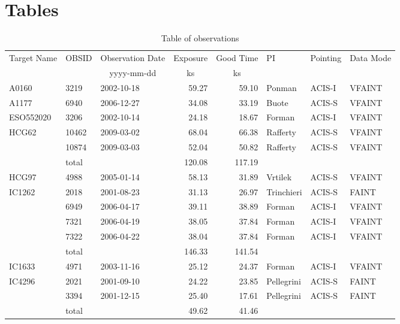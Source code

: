 \documentclass[structabstract]{aa}
\begin{document}
\section{Tables}\label{app:tables}
\begin{table}[!h]
\caption{Table of observations}
\begin{center}
\setlength\extrarowheight{2pt}
\begin{tabularx}{\textwidth}{XlXrrXXX}
\hline\hline
Target Name & \multicolumn{1}{c}{OBSID} & \multicolumn{1}{c}{Observation Date} & \multicolumn{1}{c}{Exposure} & \multicolumn{1}{c}{Good Time} & \multicolumn{1}{l}{PI} & \multicolumn{1}{l}{Pointing} & \multicolumn{1}{l}{Data Mode} \\ 
 & & \multicolumn{1}{c}{yyyy-mm-dd} & \multicolumn{1}{c}{ks} & \multicolumn{1}{c}{ks} & & & \\ \hline
A0160 & 3219 & 2002-10-18 & 59.27 & 59.10 & Ponman & ACIS-I & VFAINT \\ \hline
A1177 & 6940 & 2006-12-27 & 34.08 & 33.19 & Buote & ACIS-S & VFAINT \\ \hline
ESO552020 & 3206 & 2002-10-14 & 24.18 & 18.67 & Forman & ACIS-I & VFAINT \\ \hline
HCG62 & 10462 & 2009-03-02 & 68.04 & 66.38 & Rafferty & ACIS-S & VFAINT \\ 
 & 10874 & 2009-03-03 & 52.04 & 50.82 & Rafferty & ACIS-S & VFAINT \\ 
 & total &  & 120.08 & 117.19 &  &  &  \\ \hline
HCG97 & 4988 & 2005-01-14 & 58.13 & 31.89 & Vrtilek & ACIS-S & VFAINT \\\hline 
IC1262 & 2018 & 2001-08-23 & 31.13 & 26.97 & Trinchieri & ACIS-S & FAINT \\
 & 6949 & 2006-04-17 & 39.11 & 38.89 & Forman & ACIS-I & VFAINT \\ 
 & 7321 & 2006-04-19 & 38.05 & 37.84 & Forman & ACIS-I & VFAINT \\ 
 & 7322 & 2006-04-22 & 38.04 & 37.84 & Forman & ACIS-I & VFAINT \\ 
 & total &  & 146.33 & 141.54 &  &  &  \\ \hline
IC1633 & 4971 & 2003-11-16 & 25.12 & 24.37 & Forman & ACIS-I & VFAINT \\\hline 
IC4296 & 2021 & 2001-09-10 & 24.22 & 23.85 & Pellegrini & ACIS-S & FAINT \\ 
 & 3394 & 2001-12-15 & 25.40 & 17.61 & Pellegrini & ACIS-S & FAINT \\ 
 & total &  & 49.62 & 41.46 &  &  &  \\ \hline

\end{tabularx}
\end{center}
\end{table}
\end{document}
